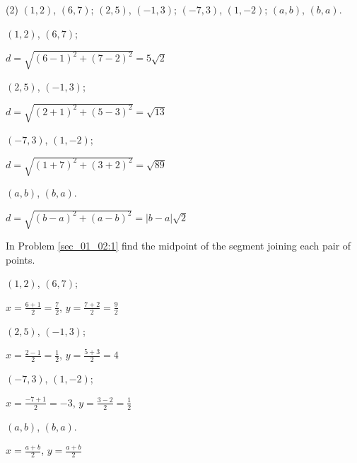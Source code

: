 \begin{questions}
  \begin{tasks}(2)
    \task $(1,2)$, $(6,7)$;
    \task $(2,5)$, $(-1,3)$;
    \task $(-7, 3)$, $(1, -2)$;
    \task $(a, b)$, $(b, a)$.
  \end{tasks}
  \begin{tasks}
    \task $(1,2)$, $(6,7)$;
    \begin{solution}
      $d=\sqrt{(6-1)^2+(7-2)^2}=5\sqrt{2}$
    \end{solution}
    \task $(2,5)$, $(-1,3)$;
    \begin{solution}
      $d=\sqrt{(2+1)^2+(5-3)^2}=\sqrt{13}$
    \end{solution}
    \task $(-7, 3)$, $(1, -2)$;
    \begin{solution}
      $d=\sqrt{(1+7)^2+(3+2)^2}=\sqrt{89}$
    \end{solution}
    \task $(a, b)$, $(b, a)$.
    \begin{solution}
      $d=\sqrt{(b-a)^2+(a-b)^2}=\left| b-a \right| \sqrt{2}$
    \end{solution}
  \end{tasks}

  \item In Problem \ref{sec_01_02:1} find the midpoint of the segment joining each pair of points.

  \begin{tasks}
    \task $(1,2)$, $(6,7)$;
    \begin{solution}
      \(x=\frac{6+1}{2} = \frac{7}{2}\), \(y=\frac{7+2}{2}=\frac{9}{2}\)
    \end{solution}
    \task $(2,5)$, $(-1,3)$;
    \begin{solution}
      \(x=\frac{2-1}{2}=\frac{1}{2}\), \(y=\frac{5+3}{2}=4\)
    \end{solution}
    \task $(-7, 3)$, $(1, -2)$;
    \begin{solution}
      \(x=\frac{-7+1}{2}=-3\), \(y=\frac{3-2}{2}=\frac{1}{2}\)
    \end{solution}
    \task $(a, b)$, $(b, a)$.
    \begin{solution}
      \(x=\frac{a+b}{2}\), \(y=\frac{a+b}{2}\)
    \end{solution}
  \end{tasks}


\end{questions}
